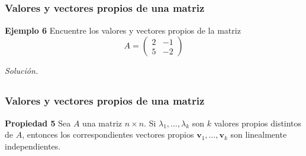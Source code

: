 \subsection{}

\begin{frame}\frametitle{Valores y vectores propios de una matriz}
	
	
	\begin{ej}{\textbf{Ejemplo 6}}
		Encuentre los valores y vectores propios de la matriz
		\[
		A =
		\left(
		\begin{array}{rr}
		2 & -1\\[1mm]		
		5 & -2
		\end{array}
		\right)
		\]	
	\end{ej}
	\textit{Solución.}
	
\end{frame}


\subsection{}

\begin{frame}\frametitle{Valores y vectores propios de una matriz}	
	
	\begin{prop}{\textbf{Propiedad 5}}
		\justifying
		Sea $A$ una matriz $n\times n$. Si $\lambda_1,\hdots,\lambda_k$ son $k$ valores propios distintos de $A$, entonces los correspondientes
		vectores propios $\mathbf{v}_1,\hdots,\mathbf{v}_k$ son linealmente independientes.
	\end{prop}		
	
\end{frame}

